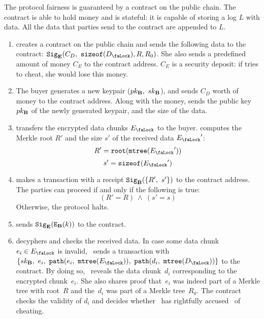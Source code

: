 The protocol fairness is guaranteed by a contract on the public chain. The contract is able to hold money and is stateful: it is capable of storing a log $L$ with data. All the data that parties send to the contract are appended to $L$.

\begin{enumerate}
\item {} creates a contract on the public chain and sends the following data to the contract: $\Sign_\Party{E}(C_D,\ \SizeOf(\Lock{D}), R, R_0)$. She also sends a predefined amount of money $C_E$ to the contract address. $C_E$ is a security deposit: if  tries to cheat, she would lose this money.
\item The buyer generates a new keypair ($pk_{\mathbf{B}},\ sk_{\mathbf{B}}$), and sends $C_D$ worth of money to the contract address. Along with the money,  sends the public key $pk_{\mathbf{B}}$ of the newly generated keypair, and the size of the data.
\item {} transfers the encrypted data chunks $\Lock{E}$ to the buyer.  computes the Merkle root $R'$ and the size $s'$ of the received data $\Lock{E}'$:
\begin{equation}
R' = \Root(\MerkleTree(\Lock{E}'))
\end{equation}
\begin{equation}
s' = \SizeOf(\Lock{E}')
\end{equation}
\item {} makes a transaction with a receipt $\mathtt{Sig}_{\mathbf{B}}(\{R',\ s'\})$ to the contract address. The parties can proceed if and only if the following is true:
\begin{equation}
(R' = R)\ \land\ (s' = s)
\end{equation}
Otherwise, the protocol halts.
\item {} sends $\mathtt{Sig}_{\mathbf{E}}(\mathtt{E}_{\mathbf{B}}(k))$ to the contract.
\item {} decyphers and checks the received data. In case some data chunk $e_i \in \Lock{E}$ is invalid, ~sends a transaction with~$\{\SecretKey{B},\ e_i,\ \Path(e_i,\ \MerkleTree(\Lock{E})),\ \Path(d_i,\ \MerkleTree(\Lock{D}))\}$ to the contract. By doing so, ~reveals the data chunk~$d_i$ corresponding to the encrypted chunk~$e_i$.  She also shares proof that~$e_i$ was indeed part of a Merkle tree with root~$R$ and the~$d_i$ was part of a Merkle tree~$R_0$. The contract checks the validity of $d_i$ and decides whether ~has rightfully accused~ of cheating.
\end{enumerate}

